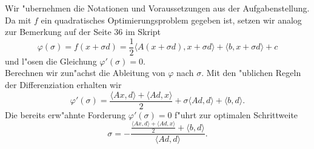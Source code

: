 
Wir "ubernehmen die Notationen und Voraussetzungen aus der Aufgabenstellung. Da mit $f$ ein quadratisches Optimierungsproblem gegeben ist, setzen wir analog zur Bemerkung
auf der Seite 36 im Skript
\[
\varphi(\sigma) = f(x+\sigma d) =
\frac{1}{2}\langle A(x+\sigma d),x+\sigma d \rangle + \langle b, x+\sigma d \rangle + c
\]
 und l"osen die Gleichung $\varphi'(\sigma) = 0$.\\

 Berechnen wir zun"achst die Ableitung von $\varphi$ nach $\sigma$. Mit den "ublichen Regeln der Differenziation erhalten wir
\[
\varphi'(\sigma) = \frac{\langle Ax, d\rangle + \langle Ad, x \rangle}{2} + \sigma\langle Ad, d\rangle + \langle b,d \rangle .
\]
Die bereits erw"ahnte Forderung $\varphi'(\sigma) = 0$ f"uhrt zur optimalen Schrittweite
\[
\sigma = - \frac{\frac{\langle Ax, d\rangle + \langle Ad, x \rangle}{2} + \langle b,d \rangle}{\langle Ad, d \rangle}.
\]
